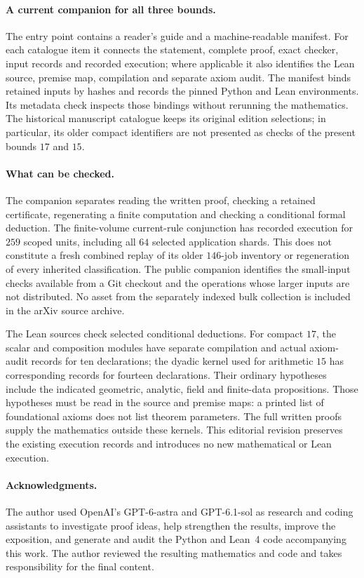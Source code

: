 \documentclass[11pt]{article}
\theoremstyle{remark}\newtheorem{remark}[theorem]{Remark}
\numberwithin{equation}{section}
\begin{document}
\paragraph{A current companion for all three bounds.}
The entry point
\href{https://github.com/sashakolpakov/CoxeterPolytopes/tree/main/repro/dimension_bounds}{}
contains a reader's guide and a machine-readable manifest. For each
catalogue item it connects the statement, complete proof, exact checker,
input records and recorded execution; where applicable it also identifies
the Lean source, premise map, compilation and separate axiom audit.
The manifest binds retained inputs by hashes and records the pinned Python
and Lean environments. Its metadata check inspects those bindings without
rerunning the mathematics. The historical manuscript catalogue keeps its
original edition selections; in particular, its older compact identifiers
are not presented as checks of the present bounds $17$ and $15$.

\paragraph{What can be checked.}
The companion separates reading the written proof, checking a retained
certificate, regenerating a finite computation and checking a conditional
formal deduction. The finite-volume current-rule conjunction has recorded
execution for $259$ scoped units, including all $64$ selected application
shards. This does not constitute a fresh combined replay of its older
$146$-job inventory or regeneration of every inherited classification.
The public companion identifies the small-input checks available from a
Git checkout and the operations whose larger inputs are not distributed.
No asset from the separately indexed bulk collection is included in the
arXiv source archive.

The Lean sources check selected conditional deductions. For compact $17$,
the scalar and composition modules have separate compilation and actual
axiom-audit records for ten declarations; the dyadic kernel used for
arithmetic $15$ has corresponding records for fourteen declarations.
Their ordinary hypotheses include the indicated geometric, analytic,
field and finite-data propositions. Those hypotheses must be read in the
source and premise maps: a printed list of foundational axioms does not
list theorem parameters. The full written proofs supply the mathematics
outside these kernels. This editorial revision preserves the existing
execution records and introduces no new mathematical or Lean execution.

\paragraph{Acknowledgments.}
The author used OpenAI's GPT-6-astra and GPT-6.1-sol as research and
coding assistants to investigate proof ideas, help strengthen the
results, improve the exposition, and generate and audit the Python
and Lean~4 code accompanying this work. The author reviewed the
resulting mathematics and code and takes responsibility for the
final content.

\begingroup\small\raggedright


\endgroup
\end{document}
